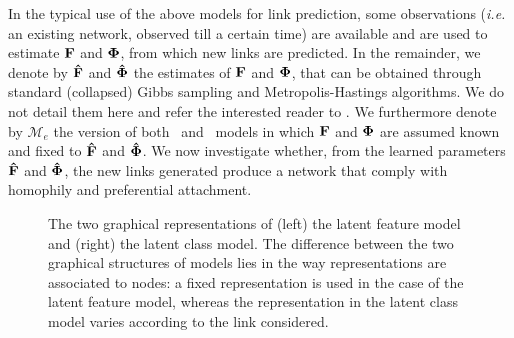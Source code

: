 In the typical use of the above models for link prediction, some observations (\textit{i.e.} an existing network, observed till a certain time) are available and are used to estimate $\mathbf{F}$ and $\mathbf{\Phi}$, from which new links are predicted. In the remainder, we denote by $\mathbf{\hat{F}}$ and $\mathbf{\hat{\Phi}}$ the estimates of $\mathbf{F}$ and $\mathbf{\Phi}$, that can be obtained through standard (collapsed) Gibbs sampling and Metropolis-Hastings algorithms. We do not detail them here and refer the interested reader to \cite{ILFRM,IBP,HDP,fan2015dynamic}. We furthermore denote by $\mathcal{M}_e$ the version of both \ifm\ and \imb\ models in which $\mathbf{F}$ and $\mathbf{\Phi}$ are assumed known and fixed to $\mathbf{\hat{F}}$ and $\mathbf{\hat{\Phi}}$. We now investigate whether, from the learned parameters $\mathbf{\hat{F}}$ and $\mathbf{\hat{\Phi}}$, the new links generated produce a network that comply with homophily and preferential attachment.

\begin{figure}[t]
	\centering
	\vspace{1cm}
	\scalebox{0.88}{
	}
	\endminipage
	\scalebox{0.88}{
		}
	\endminipage
	\caption{The two graphical representations of (left) the latent feature model and (right) the latent class model. The difference between the two graphical structures of  models lies in the way representations are associated to nodes: a fixed representation is used in the case of the latent feature model, whereas the representation in the latent class model varies according to the link considered.}
	\label{fig:mmm}
\end{figure}
